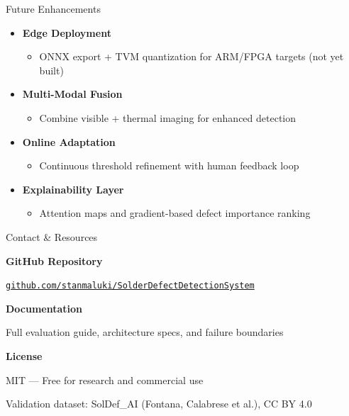 \documentclass[aspectratio=169, 11pt]{beamer}
\newcommand{\emphred}[1]{\textcolor{secondary}{#1}}
\begin{document}
\begin{frame}{\emphred{Future Enhancements}}
    \begin{itemize}
        \item \textbf{Edge Deployment}
        \begin{itemize}
            \item ONNX export + TVM quantization for ARM/FPGA targets (not yet built)
        \end{itemize}

        \item \textbf{Multi-Modal Fusion}
        \begin{itemize}
            \item Combine visible + thermal imaging for enhanced detection
        \end{itemize}

        \item \textbf{Online Adaptation}
        \begin{itemize}
            \item Continuous threshold refinement with human feedback loop
        \end{itemize}

        \item \textbf{Explainability Layer}
        \begin{itemize}
            \item Attention maps and gradient-based defect importance ranking
        \end{itemize}
    \end{itemize}
\end{frame}

\begin{frame}{\emphred{Contact \& Resources}}
    \begin{center}
        \Large
        \textbf{\emphred{GitHub Repository}}

        \vspace{0.4cm}
        \texttt{\href{https://github.com/stanmaluki/SolderDefectDetectionSystem}{github.com/stanmaluki/SolderDefectDetectionSystem}}

        \vspace{1cm}
        \textbf{\emphred{Documentation}}

        \vspace{0.4cm}
        Full evaluation guide, architecture specs, and failure boundaries

        \vspace{1cm}
        \textbf{\emphred{License}}

        \vspace{0.4cm}
        MIT --- Free for research and commercial use

        \vspace{1cm}
        {\small Validation dataset: SolDef\_AI (Fontana, Calabrese et al.), CC BY 4.0}
    \end{center}
\end{frame}
\end{document}
